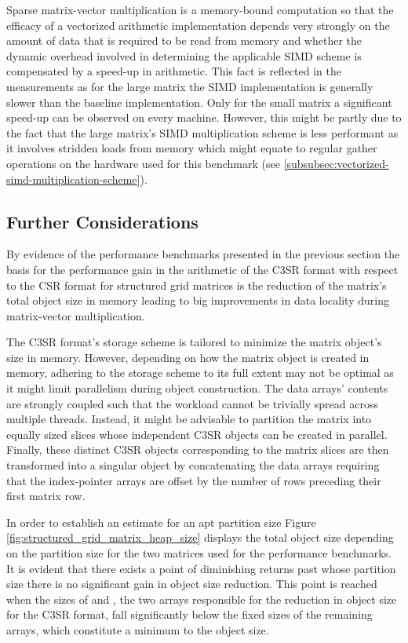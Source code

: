 \documentclass{article}
\begin{document}
    Sparse matrix-vector multiplication is a memory-bound computation so that the efficacy of a vectorized arithmetic implementation depends very strongly on the amount of data that is required to be read from memory and whether the dynamic overhead involved in determining the applicable SIMD scheme is compensated by a speed-up in arithmetic. This fact is reflected in the measurements as for the large matrix the SIMD implementation is generally slower than the baseline implementation. Only for the small matrix a significant speed-up can be observed on every machine. However, this might be partly due to the fact that the large matrix's SIMD multiplication scheme is less performant as it involves stridden loads from memory which might equate to regular gather operations on the hardware used for this benchmark (see \ref{subsubsec:vectorized-simd-multiplication-scheme}).

  \subsection{Further Considerations}

    By evidence of the performance benchmarks presented in the previous section the basis for the performance gain in the arithmetic of the C3SR format with respect to the CSR format for structured grid matrices is the reduction of the matrix's total object size in memory leading to big improvements in data locality during matrix-vector multiplication.

    The C3SR format's storage scheme is tailored to minimize the matrix object's size in memory. However, depending on how the matrix object is created in memory, adhering to the storage scheme to its full extent may not be optimal as it might limit parallelism during object construction. The data arrays' contents are strongly coupled such that the workload cannot be trivially spread across multiple threads. Instead, it might be advisable to partition the matrix into equally sized slices whose independent C3SR objects can be created in parallel. Finally, these distinct C3SR objects corresponding to the matrix slices are then transformed into a singular object by concatenating the data arrays requiring that the index-pointer arrays are offset by the number of rows preceding their first matrix row.

    In order to establish an estimate for an apt partition size Figure \ref{fig:structured_grid_matrix_heap_size} displays the total object size depending on the partition size for the two matrices used for the performance benchmarks. It is evident that there exists a point of diminishing returns past whose partition size there is no significant gain in object size reduction. This point is reached when the sizes of \V and \J, the two arrays responsible for the reduction in object size for the C3SR format, fall significantly below the fixed sizes of the remaining arrays, which constitute a minimum to the object size.
\end{document}
